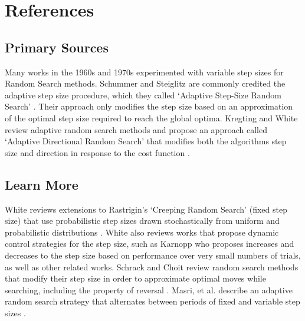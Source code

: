\documentclass[a4paper, 11pt]{article}
\begin{document}


\section{References}
\label{sec:references}

% 
% 
\subsection{Primary Sources}
Many works in the 1960s and 1970s experimented with variable step sizes for Random Search methods. 
Schummer and Steiglitz are commonly credited the adaptive step size procedure, which they called `Adaptive Step-Size Random Search' \cite{Schumer1968}. Their approach only modifies the step size based on an approximation of the optimal step size required to reach the global optima.
Kregting and White review adaptive random search methods and propose an approach called `Adaptive Directional Random Search' that modifies both the algorithms step size and direction in response to the cost function \cite{Kregting1971}.

% 
% 
\subsection{Learn More}
White reviews extensions to Rastrigin's `Creeping Random Search' \cite{Rastrigin1963} (fixed step size) that use probabilistic step sizes drawn stochastically from uniform and probabilistic distributions \cite{White1971}. White also reviews works that propose dynamic control strategies for the step size, such as Karnopp \cite{Karnopp1963} who proposes increases and decreases to the step size based on performance over very small numbers of trials, as well as other related works.
Schrack and Choit review random search methods that modify their step size in order to approximate optimal moves while searching, including the property of reversal \cite{Schrack1976}.
Masri, et al. describe an adaptive random search strategy that alternates between periods of fixed and variable step sizes \cite{Masri1980}.
\end{document}
